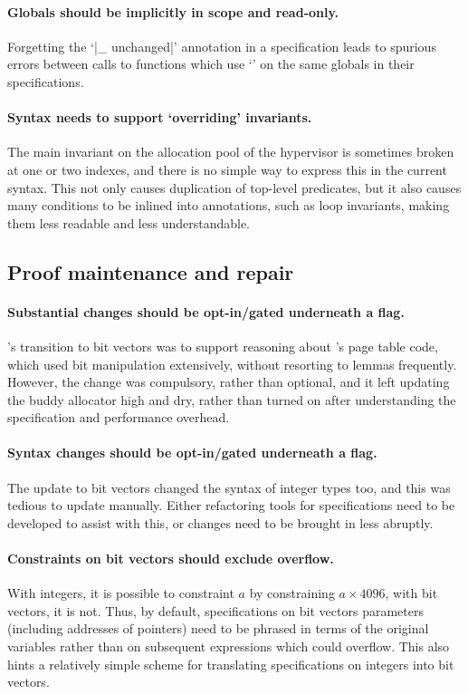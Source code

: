 \paragraph{Globals should be implicitly in scope and read-only.} Forgetting the
`\cninline|{_} unchanged|' annotation in a specification leads to spurious
errors between calls to functions which use `' on the same
globals in their specifications.

\paragraph{Syntax needs to support `overriding' invariants.} The main invariant
on the allocation pool of the hypervisor is sometimes broken at one or two
indexes, and there is no simple way to express this in the current syntax. This
not only causes duplication of top-level predicates, but it also causes many
conditions to be inlined into annotations, such as loop invariants, making them
less readable and less understandable.

\subsection{Proof maintenance and repair}

\paragraph{Substantial changes should be opt-in/gated underneath a flag.}
's transition to bit vectors was to support reasoning about 's
page table code, which used bit manipulation extensively, without resorting to
lemmas frequently. However, the change was compulsory, rather than optional,
and it left updating the buddy allocator high and dry, rather than turned on
after understanding the specification and performance overhead.

\paragraph{Syntax changes should be opt-in/gated underneath a flag.} The update
to bit vectors changed the syntax of integer types too, and this was tedious to
update manually. Either refactoring tools for specifications need to be
developed to assist with this, or changes need to be brought in less abruptly.

\paragraph{Constraints on bit vectors should exclude overflow.} With integers,
it is possible to constraint $a$ by constraining $a \times{} 4096$, with bit
vectors, it is not. Thus, by default, specifications on bit vectors parameters
(including addresses of pointers) need to be phrased in terms of the original
variables rather than on subsequent expressions which could overflow. This also
hints a relatively simple scheme for translating specifications on integers
into bit vectors.

